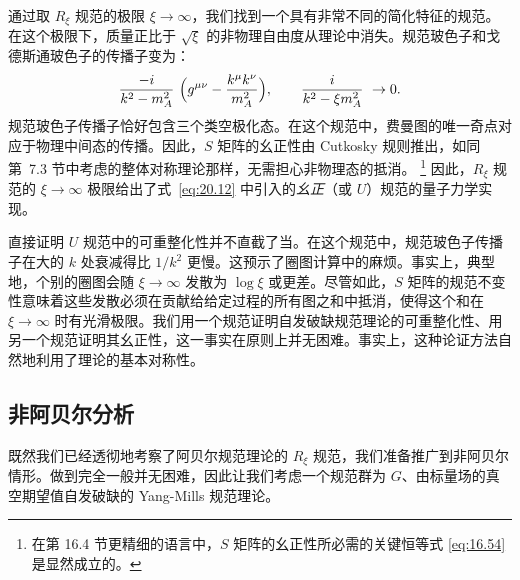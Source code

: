通过取 $R_\xi$ 规范的极限 $\xi\to\infty$，我们找到一个具有非常不同的简化特征的规范。在这个极限下，质量正比于 $\sqrt{\xi}$ 的非物理自由度从理论中消失。规范玻色子和戈德斯通玻色子的传播子变为：
\begin{equation}
  \frac{-i}{k^2 - m_A^2}\ \Bigl( g^{\mu\nu} - \frac{k^\mu k^\nu}{m_A^2}
    \Bigr),\qquad \frac{i}{k^2 - \xi m_A^2}\ \to 0 .
\end{equation}
规范玻色子传播子恰好包含三个类空极化态。在这个规范中，费曼图的唯一奇点对应于物理中间态的传播。因此，$S$ 矩阵的幺正性由 Cutkosky 规则推出，如同第~7.3 节中考虑的整体对称理论那样，无需担心非物理态的抵消。%
\footnote{在第 16.4 节更精细的语言中，$S$ 矩阵的幺正性所必需的关键恒等式 \eqref{eq:16.54} 是显然成立的。} 因此，$R_\xi$ 规范的 $\xi\to\infty$ 极限给出了式~\eqref{eq:20.12} 中引入的\emph{幺正}（或 $U$）规范的量子力学实现。

直接证明 $U$ 规范中的可重整化性并不直截了当。在这个规范中，规范玻色子传播子在大的 $k$ 处衰减得比 $1/k^2$ 更慢。这预示了圈图计算中的麻烦。事实上，典型地，个别的圈图会随 $\xi\to\infty$ 发散为 $\log\xi$ 或更差。尽管如此，$S$ 矩阵的规范不变性意味着这些发散必须在贡献给给定过程的所有图之和中抵消，使得这个和在 $\xi\to\infty$ 时有光滑极限。我们用一个规范证明自发破缺规范理论的可重整化性、用另一个规范证明其幺正性，这一事实在原则上并无困难。事实上，这种论证方法自然地利用了理论的基本对称性。

\subsection{非阿贝尔分析}

既然我们已经透彻地考察了阿贝尔规范理论的 $R_\xi$ 规范，我们准备推广到非阿贝尔情形。做到完全一般并无困难，因此让我们考虑一个规范群为 $G$、由标量场的真空期望值自发破缺的 Yang-Mills 规范理论。

